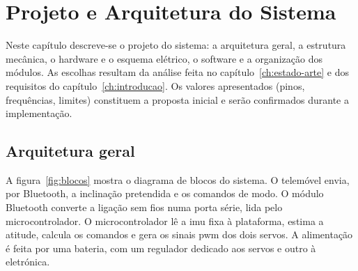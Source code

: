 \chapter{Projeto e Arquitetura do Sistema}
\label{ch:arquitetura}

Neste capítulo descreve-se o projeto do sistema: a arquitetura geral, a estrutura mecânica, o hardware e o esquema elétrico, o software e a organização dos módulos. As escolhas resultam da análise feita no capítulo~\ref{ch:estado-arte} e dos requisitos do capítulo~\ref{ch:introducao}. Os valores apresentados (pinos, frequências, limites) constituem a proposta inicial e serão confirmados durante a implementação.

\section{Arquitetura geral}
A figura~\ref{fig:blocos} mostra o diagrama de blocos do sistema. O telemóvel envia, por Bluetooth, a inclinação pretendida e os comandos de modo. O módulo Bluetooth converte a ligação sem fios numa porta série, lida pelo microcontrolador. O microcontrolador lê a \gls{imu} fixa à plataforma, estima a atitude, calcula os comandos e gera os sinais \gls{pwm} dos dois servos. A alimentação é feita por uma bateria, com um regulador dedicado aos servos e outro à eletrónica.

